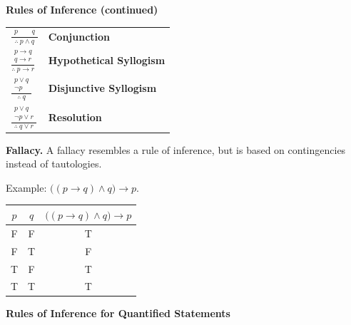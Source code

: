 \documentclass{article}
\begin{document}
\newpage

\textbf{Rules of Inference (continued)}

\medskip

\begin{center}
\begin{tabular}{@{}p{}l@{}}
$\displaystyle \frac{\begin{gathered}p \qquad q\end{gathered}}{\therefore\ p \land q}$ & \textbf{Conjunction} \\[1.3em]
$\displaystyle \frac{\begin{gathered}p \to q\\q \to r\end{gathered}}{\therefore\ p \to r}$ & \textbf{Hypothetical Syllogism} \\[1.3em]
$\displaystyle \frac{\begin{gathered}p \lor q\\\lnot p\end{gathered}}{\therefore\ q}$ & \textbf{Disjunctive Syllogism} \\[1.3em]
$\displaystyle \frac{\begin{gathered}p \lor q\\\lnot p \lor r\end{gathered}}{\therefore\ q \lor r}$ & \textbf{Resolution}
\end{tabular}
\end{center}

\bigskip

\textbf{Fallacy.} A fallacy resembles a rule of inference, but is based on contingencies instead of tautologies.

\medskip

Example: $\bigl((p \to q) \land q\bigr) \to p$.

\medskip

\begin{center}
\begin{tabular}{cc|c}
$p$ & $q$ & $\bigl((p \to q) \land q\bigr) \to p$ \\
\hline
F & F & T \\
F & T & F \\
T & F & T \\
T & T & T
\end{tabular}
\end{center}

\newpage

\bigskip

\textbf{Rules of Inference for Quantified Statements}
\end{document}
